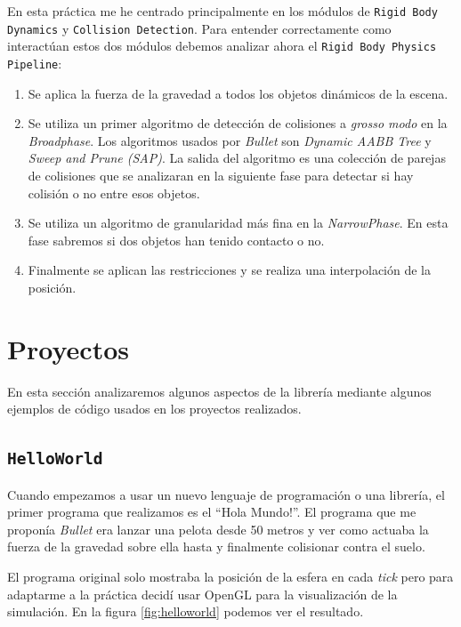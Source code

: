 \documentclass[12pt]{article}
\begin{document}
En esta práctica me he centrado principalmente en los módulos de \texttt{Rigid Body Dynamics} y \texttt{Collision Detection}. Para entender correctamente como interactúan estos dos módulos debemos analizar ahora el \texttt{Rigid Body Physics Pipeline}:

\begin{enumerate}
  \item Se aplica la fuerza de la gravedad a todos los objetos dinámicos de la escena.
  \item Se utiliza un primer algoritmo de detección de colisiones a \textit{grosso modo} en la \textit{Broadphase}. Los algoritmos usados por \textit{Bullet} son \textit{Dynamic AABB Tree} y \textit{Sweep and Prune (SAP)}. La salida del algoritmo es una colección de parejas de colisiones que se analizaran en la siguiente fase para detectar si hay colisión o no entre esos objetos.
  \item Se utiliza un algoritmo de granularidad más fina en la \textit{NarrowPhase}. En esta fase sabremos si dos objetos han tenido contacto o no.
  \item Finalmente se aplican las restricciones y se realiza una interpolación de la posición.
\end{enumerate}

\section{Proyectos}

En esta sección analizaremos algunos aspectos de la librería mediante algunos ejemplos de código usados en los proyectos realizados.

\subsection{\texttt{HelloWorld}}

Cuando empezamos a usar un nuevo lenguaje de programación o una librería, el primer programa que realizamos es el ``Hola Mundo!''. El programa que me proponía \textit{Bullet} era lanzar una pelota desde 50 metros y ver como actuaba la fuerza de la gravedad sobre ella hasta y finalmente colisionar contra el suelo.

El programa original solo mostraba la posición de la esfera en cada \textit{tick} pero para adaptarme a la práctica decidí usar OpenGL para la visualización de la simulación. En la figura \ref{fig:helloworld} podemos ver el resultado.
\end{document}
